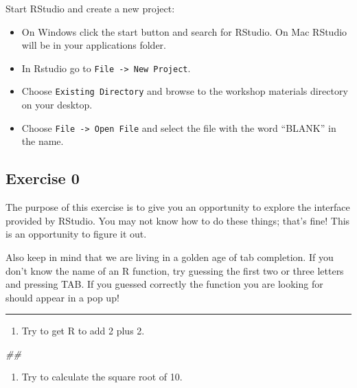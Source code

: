 \documentclass[]{book}
\newenvironment{Shaded}{\begin{snugshade}}{\end{snugshade}}
\newcommand{\CommentTok}[1]{\textcolor[rgb]{0.56,0.35,0.01}{\textit{#1}}}
\providecommand{\tightlist}{%
  \setlength{\itemsep}{0pt}\setlength{\parskip}{0pt}}
\begin{document}
Start RStudio and create a new project:

\begin{itemize}
\tightlist
\item
  On Windows click the start button and search for RStudio. On Mac
  RStudio will be in your applications folder.
\item
  In Rstudio go to \texttt{File\ -\textgreater{}\ New\ Project}.
\item
  Choose \texttt{Existing\ Directory} and browse to the workshop materials directory on your desktop.
\item
  Choose \texttt{File\ -\textgreater{}\ Open\ File} and select the file with the word ``BLANK'' in the name.
\end{itemize}

\hypertarget{exercise-0}{%
\subsection{Exercise 0}\label{exercise-0}}

The purpose of this exercise is to give you an opportunity to explore
the interface provided by RStudio. You may not know how to do these things;
that's fine! This is an opportunity to figure it out.

Also keep in mind that we are living in a golden age of tab completion.
If you don't know the name of an R function, try guessing the first two
or three letters and pressing TAB. If you guessed correctly the function
you are looking for should appear in a pop up!

\begin{center}\rule{0.5\linewidth}{\linethickness}\end{center}

\begin{enumerate}
\def\labelenumi{\arabic{enumi}.}
\tightlist
\item
  Try to get R to add 2 plus 2.
\end{enumerate}

\begin{Shaded}
\begin{Highlighting}[]
\CommentTok{##}
\end{Highlighting}
\end{Shaded}

\begin{enumerate}
\def\labelenumi{\arabic{enumi}.}
\setcounter{enumi}{1}
\tightlist
\item
  Try to calculate the square root of 10.
\end{enumerate}
\end{document}
